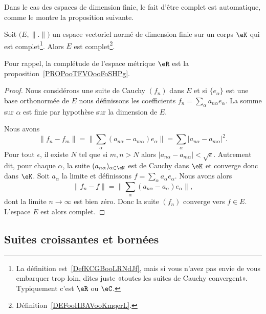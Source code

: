 Dans le cas des espaces de dimension finie, le fait d'être complet est automatique, comme le montre la proposition suivante.
\begin{proposition}     \label{PROPooGJDTooXOoYfw}
    Soit \( \big( E,\| . \| \big)\) un espace vectoriel normé de dimension finie sur un corps \( \eK\) qui est complet\footnote{La définition est~\ref{DefKCGBooLRNdJf}, mais si vous n'avez pas envie de vous embarquer trop loin, dites juste «toutes les suites de Cauchy convergent». Typiquement c'est \( \eR\) ou \( \eC\).}. Alors \( E\) est complet\footnote{Définition~\ref{DEFooHBAVooKmqerL}.}.
\end{proposition}
Pour rappel, la complétude de l'espace métrique \( \eR\) est la proposition~\ref{PROPooTFVOooFoSHPg}.

\begin{proof}
    Nous considérons une suite de Cauchy \( (f_n)\) dans \( E\) et si \( \{ e_{\alpha} \} \) est une base orthonormée de \( E\) nous définissons les coefficients \( f_n=\sum_{\alpha}a_{n\alpha}e_{\alpha} \). La somme sur \( \alpha\) est finie par hypothèse sur la dimension de \( E\).

    Nous avons
    \begin{equation}
        \| f_n-f_m \|=\| \sum_{\alpha}(a_{n\alpha}-a_{m\alpha})e_{\alpha} \|=\sum_{\alpha}| a_{n\alpha}-a_{m\alpha} |^2.
    \end{equation}
    Pour tout \( \epsilon\), il existe \( N\) tel que si \( m,n>N\) alors \( | a_{n\alpha}-a_{m\alpha} |<\sqrt{ \epsilon }\). Autrement dit, pour chaque \( \alpha\), la suite \( (a_{n\alpha})_{\alpha\in \eN}\) est de Cauchy dans \( \eK\) et converge donc dans \( \eK\). Soit \( a_{\alpha}\) la limite et définissons \( f=\sum_{\alpha}a_{\alpha}e_{\alpha}\). Nous avons alors
    \begin{equation}
        \| f_n-f \|=\| \sum_{\alpha}(a_{n\alpha}-a_{\alpha})e_{\alpha} \|,
    \end{equation}
    dont la limite \( n\to \infty\) est bien zéro. Donc la suite \( (f_n)\) converge vers \( f\in E\). L'espace \( E\) est alors complet.
\end{proof}

\subsection{Suites croissantes et bornées}

